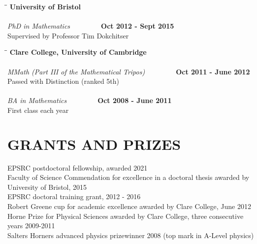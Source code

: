 \documentclass{res}
\begin{document}
\begin{resume}
\bigskip

\vspace{-0.1in}	
   \begin{tabbing}
   \hspace{2in}\= \hspace{2in}\= \kill %
    {\bf University of Bristol}\\
 ~\\
      {\it PhD in Mathematics} \>~\> ~~~~~~ {\bf Oct 2012 - Sept 2015} \\       
    Supervised by Professor Tim Dokchitser      
  \end{tabbing}\vspace{-17pt}      %
     \begin{tabbing}
   \hspace{2in}\= \hspace{2in}\= \kill %
    {\bf Clare College, University of Cambridge}\\
~\\
      {\it MMath (Part III of the Mathematical Tripos) } \>~\> ~~~~~~ {\bf Oct 2011 - June 2012}\\       
    Passed with Distinction (ranked 5th) \\   
~\\
      {\it BA in Mathematics } \>~\> ~~~~~~ {\bf Oct 2008 - June 2011} \\       
    First class each year   \\   
\end{tabbing}\vspace{-25pt}   



\section{GRANTS AND PRIZES} 
\bigskip 
EPSRC postdoctoral fellowship, awarded 2021 \medskip \\
    Faculty of Science Commendation for excellence in a doctoral thesis awarded by University of Bristol, 2015 \medskip \\
    EPSRC doctoral training grant, 2012 - 2016 \medskip \\         
    Robert Greene cup for academic excellence awarded by Clare College, June 2012 \medskip \\
Horne Prize for Physical Sciences awarded by Clare College, three consecutive years 2009-2011 \medskip \\
Salters Horners advanced physics prizewinner 2008 (top mark in A-Level physics)      


\end{resume}
\end{document}
